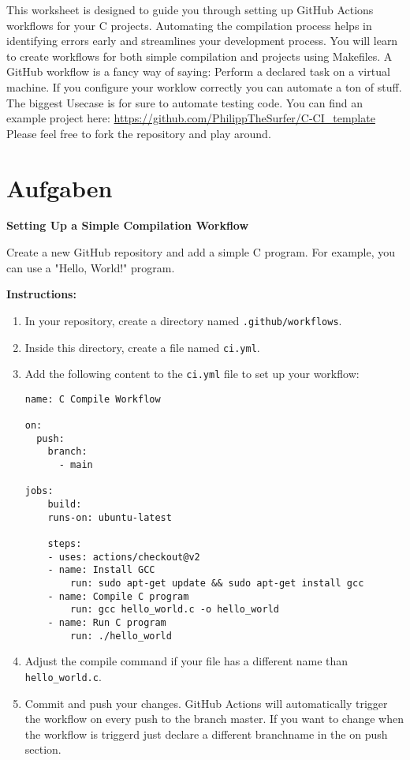 \documentclass{dcbl/challenge}
\begin{document}
This worksheet is designed to guide you through setting up GitHub Actions workflows for your C projects. Automating the compilation process helps in identifying errors early and streamlines your development process. You will learn to create workflows for both simple compilation and projects using Makefiles.
A GitHub workflow is a fancy way of saying: Perform a declared task on a virtual machine. If you configure your worklow correctly you can automate a ton of stuff. The biggest Usecase is for sure to automate testing code. 
You can find an example project here: \url{https://github.com/PhilippTheSurfer/C-CI_template}
Please feel free to fork the repository and play around.

\section*{Aufgaben}
\begin{aufgabe}
\textbf{Setting Up a Simple Compilation Workflow}

Create a new GitHub repository and add a simple C program. For example, you can use a "Hello, World!" program. 

\textbf{Instructions:}
\begin{enumerate}
    \item In your repository, create a directory named \texttt{.github/workflows}.
    \item Inside this directory, create a file named \texttt{ci.yml}.
    \item Add the following content to the \texttt{ci.yml} file to set up your workflow:
\begin{verbatim}
name: C Compile Workflow

on:
  push:
    branch:
      - main

jobs:
    build:
    runs-on: ubuntu-latest
    
    steps:
    - uses: actions/checkout@v2
    - name: Install GCC
        run: sudo apt-get update && sudo apt-get install gcc
    - name: Compile C program
        run: gcc hello_world.c -o hello_world
    - name: Run C program
        run: ./hello_world
\end{verbatim}
    \item Adjust the compile command if your file has a different name than \texttt{hello_world.c}.
    \item Commit and push your changes. GitHub Actions will automatically trigger the workflow on every push to the branch master. If you want to change when the workflow is triggerd just declare a different branchname in the on push section.
\end{enumerate}
\end{aufgabe}
\end{document}

